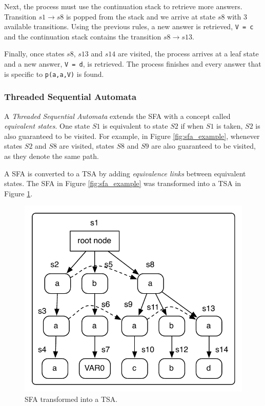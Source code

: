 Next, the process must use the continuation stack to retrieve more answers. Transition $s1 \rightarrow s8$ is popped from the stack
and we arrive at state $s8$ with 3 available transitions. Using the previous rules, a new answer is retrieved,
\texttt{V = c} and the continuation stack contains the transition $s8 \rightarrow s13$.

Finally, once states $s8$, $s13$ and $s14$ are visited, the process arrives at a leaf state and a new answer, \texttt{V = d}, is retrieved.
The process finishes and every answer that is specific to \texttt{p(a,a,V)} is found.

\subsubsection{Threaded Sequential Automata}

A \textit{Threaded Sequential Automata} extends the SFA with a concept called
\textit{equivalent states}. One state $S1$ is equivalent to state $S2$ if when $S1$ is taken, $S2$ is also
guaranteed to be visited. For example, in Figure \ref{fig:sfa_example}, whenever states $S2$ and $S8$ are
visited, states $S8$ and $S9$ are also guaranteed to be visited, as they denote the same path.

A SFA is converted to a TSA by adding \textit{equivalence links} between equivalent states.
The SFA in Figure \ref{fig:sfa_example} was transformed into a TSA in Figure \ref{fig:tsa_example}.

\begin{figure}[ht]
  \centering
    \includegraphics[scale=0.6]{tsa.pdf}
  \caption{SFA transformed into a TSA.}
  \label{fig:tsa_example}
\end{figure}

